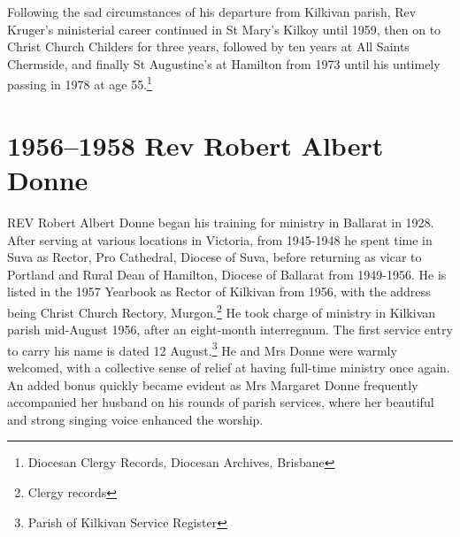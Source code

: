 Following the sad circumstances of his departure from Kilkivan parish, Rev Kruger's ministerial career continued in St Mary's Kilkoy until 1959, then on to Christ Church Childers for three years, followed by ten years at All Saints Chermside, and finally St Augustine's at Hamilton from 1973 until his untimely passing in 1978 at age 55.\footnote{Diocesan Clergy Records, Diocesan Archives, Brisbane}


\balance


\printendnotes[custom]
\setcounter{endnote}{0}
\chapter{1956--1958 Rev Robert Albert Donne}
\nobalance


\lettrine[lines=3]{R}{EV}
 Robert Albert Donne began his training for ministry in Ballarat in 1928. After serving at various locations in Victoria, from 1945-1948 he spent time in Suva as Rector, Pro Cathedral, Diocese of Suva, before returning as vicar to Portland and Rural Dean of Hamilton, Diocese of Ballarat from 1949-1956. He is listed in the 1957 Yearbook as Rector of Kilkivan from 1956, with the address being Christ Church Rectory, Murgon.\footnote{Clergy records} He took charge of ministry in Kilkivan parish mid-August 1956, after an eight-month interregnum. The first service entry to carry his name is dated 12 August.\footnote{Parish of Kilkivan Service Register} He and Mrs Donne were warmly welcomed, with a collective sense of relief at having full-time ministry once again. An added bonus quickly became evident as Mrs Margaret Donne frequently accompanied her husband on his rounds of parish services, where her beautiful and strong singing voice enhanced the worship.







